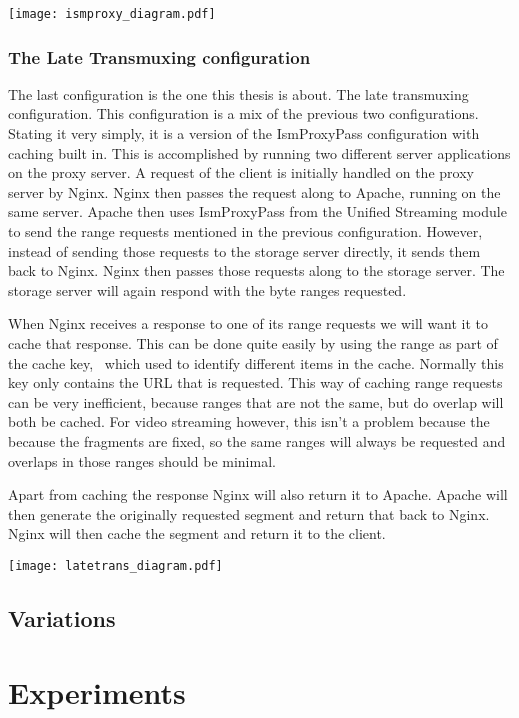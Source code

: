 \documentclass[twoside,openright]{uva-bachelor-thesis}
\begin{document}
\texttt{[image: ismproxy\_diagram.pdf]}



\subsection{The Late Transmuxing configuration}
The last configuration is the one this thesis is about. The late transmuxing
configuration. This configuration is a mix of the previous two configurations.
Stating it very simply, it is a version of the IsmProxyPass configuration with
caching built in. This is accomplished by running two different server
applications on the proxy server. A request of the client is initially handled
on the proxy server by Nginx. Nginx then passes the request along to Apache,
running on the same server. Apache then uses IsmProxyPass from the Unified
Streaming module to send the range requests mentioned in the previous
configuration.  However, instead of sending those requests to the storage server
directly, it sends them back to Nginx. Nginx then passes those requests along to
the storage server. The storage server will again respond with the byte ranges
requested.

When Nginx receives a response to one of its range requests we will want it to
cache that response. This can be done quite easily by using the range as part of
the cache key,~\autocite{nginxcacheforum} which used to identify different items in
the cache. Normally this key only contains the URL that is requested. This way
of caching range requests can be very inefficient, because ranges that are not
the same, but do overlap will both be cached. For video streaming however, this
isn't a problem because the because the fragments are fixed, so the same ranges
will always be requested and overlaps in those ranges should be minimal.

Apart from caching the response Nginx will also return it to Apache. Apache will
then generate the originally requested segment and return that back to Nginx.
Nginx will then cache the segment and return it to the client.

\texttt{[image: latetrans\_diagram.pdf]}



\section{Variations}





\chapter{Experiments}
\end{document}
